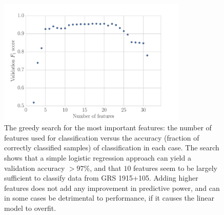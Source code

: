 \documentclass[fleqn,usenatbib]{mnras}
\begin{document}
\begin{figure}
\begin{center}
\includegraphics[width=9cm]{grs1915_feature_accuracy}
\caption{The greedy search for the most important features: the number of features used for classification versus the accuracy (fraction of correctly classified samples) of classification in each case. The search shows that a simple logistic regression approach can yield a validation accuracy $>97\%$, and that $10$ features seem to be largely sufficient to classify data from GRS 1915+105. Adding higher features does not add any improvement in predictive power, and can in some cases be detrimental to performance, if it causes the linear model to overfit.}
\label{fig:scores}
\end{center}
\end{figure}
\end{document}
